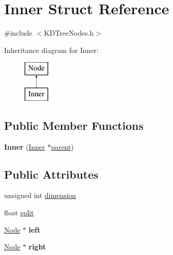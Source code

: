 \hypertarget{structInner}{\section{Inner Struct Reference}
\label{structInner}
}


{\ttfamily \#include $<$K\-D\-Tree\-Nodes.\-h$>$}

Inheritance diagram for Inner\-:\begin{figure}[H]
\begin{center}
\leavevmode
\includegraphics[height=2.000000cm]{structInner}
\end{center}
\end{figure}
\subsection*{Public Member Functions}
\begin{DoxyCompactItemize}
\item 
\hypertarget{structInner_ae70e9c4e1531be752a49ab36ac982e53}{{\bfseries Inner} (\hyperlink{structInner}{Inner} $\ast$\hyperlink{structNode_a44c2ed507b369efa2c74549d9b862c9b}{parent})}\label{structInner_ae70e9c4e1531be752a49ab36ac982e53}

\end{DoxyCompactItemize}
\subsection*{Public Attributes}
\begin{DoxyCompactItemize}
\item 
unsigned int \hyperlink{structInner_a2d01fc8187c7f779dda5196d4c432ff6}{dimension}
\item 
float \hyperlink{structInner_acef895531f508e188a51d132ef18e68f}{split}
\item 
\hypertarget{structInner_a78b1be040de13bd9209107de1a7bc725}{\hyperlink{structNode}{Node} $\ast$ {\bfseries left}}\label{structInner_a78b1be040de13bd9209107de1a7bc725}

\item 
\hypertarget{structInner_a232a2f2ccf2a57e03ebd777673392a16}{\hyperlink{structNode}{Node} $\ast$ {\bfseries right}}\label{structInner_a232a2f2ccf2a57e03ebd777673392a16}

\end{DoxyCompactItemize}
